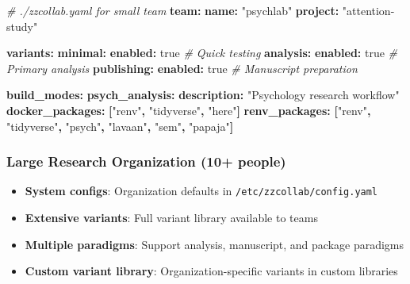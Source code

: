 \documentclass[
]{article}
\newenvironment{Shaded}{\begin{snugshade}}{\end{snugshade}}
\newcommand{\AttributeTok}[1]{\textcolor[rgb]{0.13,0.29,0.53}{#1}}
\newcommand{\CharTok}[1]{\textcolor[rgb]{0.31,0.60,0.02}{#1}}
\newcommand{\CommentTok}[1]{\textcolor[rgb]{0.56,0.35,0.01}{\textit{#1}}}
\newcommand{\FunctionTok}[1]{\textcolor[rgb]{0.13,0.29,0.53}{\textbf{#1}}}
\newcommand{\KeywordTok}[1]{\textcolor[rgb]{0.13,0.29,0.53}{\textbf{#1}}}
\newcommand{\StringTok}[1]{\textcolor[rgb]{0.31,0.60,0.02}{#1}}
\providecommand{\tightlist}{%
  \setlength{\itemsep}{0pt}\setlength{\parskip}{0pt}}
\begin{document}
\begin{Shaded}
\begin{Highlighting}[]
\CommentTok{\# ./zzcollab.yaml for small team}
\FunctionTok{team}\KeywordTok{:}
\AttributeTok{  }\FunctionTok{name}\KeywordTok{:}\AttributeTok{ }\StringTok{"psychlab"}
\AttributeTok{  }\FunctionTok{project}\KeywordTok{:}\AttributeTok{ }\StringTok{"attention{-}study"}

\FunctionTok{variants}\KeywordTok{:}
\AttributeTok{  }\FunctionTok{minimal}\KeywordTok{:}
\AttributeTok{    }\FunctionTok{enabled}\KeywordTok{:}\AttributeTok{ }\CharTok{true}\CommentTok{    \# Quick testing}
\AttributeTok{  }\FunctionTok{analysis}\KeywordTok{:}
\AttributeTok{    }\FunctionTok{enabled}\KeywordTok{:}\AttributeTok{ }\CharTok{true}\CommentTok{    \# Primary analysis}
\AttributeTok{  }\FunctionTok{publishing}\KeywordTok{:}
\AttributeTok{    }\FunctionTok{enabled}\KeywordTok{:}\AttributeTok{ }\CharTok{true}\CommentTok{    \# Manuscript preparation}

\FunctionTok{build\_modes}\KeywordTok{:}
\AttributeTok{  }\FunctionTok{psych\_analysis}\KeywordTok{:}
\AttributeTok{    }\FunctionTok{description}\KeywordTok{:}\AttributeTok{ }\StringTok{"Psychology research workflow"}
\AttributeTok{    }\FunctionTok{docker\_packages}\KeywordTok{:}\AttributeTok{ }\KeywordTok{[}\StringTok{"renv"}\KeywordTok{,}\AttributeTok{ }\StringTok{"tidyverse"}\KeywordTok{,}\AttributeTok{ }\StringTok{"here"}\KeywordTok{]}
\AttributeTok{    }\FunctionTok{renv\_packages}\KeywordTok{:}\AttributeTok{ }\KeywordTok{[}\StringTok{"renv"}\KeywordTok{,}\AttributeTok{ }\StringTok{"tidyverse"}\KeywordTok{,}\AttributeTok{ }\StringTok{"psych"}\KeywordTok{,}\AttributeTok{ }\StringTok{"lavaan"}\KeywordTok{,}\AttributeTok{ }\StringTok{"sem"}\KeywordTok{,}\AttributeTok{ }\StringTok{"papaja"}\KeywordTok{]}
\end{Highlighting}
\end{Shaded}

\subsubsection{Large Research Organization (10+
people)}\label{large-research-organization-10-people}

\begin{itemize}
\tightlist
\item
  \textbf{System configs}: Organization defaults in
  \texttt{/etc/zzcollab/config.yaml}
\item
  \textbf{Extensive variants}: Full variant library available to teams
\item
  \textbf{Multiple paradigms}: Support analysis, manuscript, and package
  paradigms
\item
  \textbf{Custom variant library}: Organization-specific variants in
  custom libraries
\end{itemize}
\end{document}
